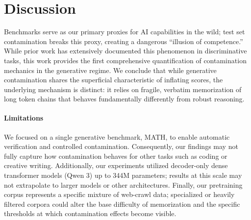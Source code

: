 \section{Discussion}

Benchmarks serve as our primary proxies for AI capabilities in the wild; test set contamination breaks this proxy, creating a dangerous ``illusion of competence.'' While prior work has extensively documented this phenomenon in discriminative tasks, this work provides the first comprehensive quantification of contamination mechanics in the generative regime. We conclude that while generative contamination shares the superficial characteristic of inflating scores, the underlying mechanism is distinct: it relies on fragile, verbatim memorization of long token chains that behaves fundamentally differently from robust reasoning.



\paragraph{Limitations}
We focused on a single generative benchmark, MATH, to enable automatic verification and controlled contamination. Consequently, our findings may not fully capture how contamination behaves for other tasks such as coding or creative writing.
Additionally, our experiments utilized decoder-only dense transformer models (Qwen 3) up to 344M parameters; results at this scale may not extrapolate to larger models or other architectures.
Finally, our pretraining corpus represents a specific mixture of web-crawl data; specialized or heavily filtered corpora could alter the base difficulty of memorization and the specific thresholds at which contamination effects become visible.

